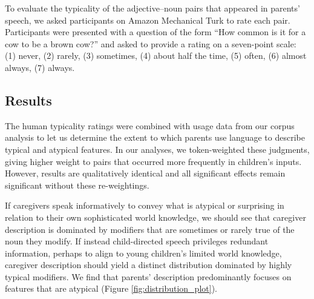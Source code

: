 \documentclass[10pt, letterpaper]{article}
\begin{document}
To evaluate the typicality of the adjective--noun pairs that appeared in
parents' speech, we asked participants on Amazon Mechanical Turk to rate
each pair. Participants were presented with a question of the form ``How
common is it for a cow to be a brown cow?'' and asked to provide a
rating on a seven-point scale: (1) never, (2) rarely, (3) sometimes, (4)
about half the time, (5) often, (6) almost always, (7) always.

\hypertarget{results}{%
\subsection{Results}\label{results}}

The human typicality ratings were combined with usage data from our
corpus analysis to let us determine the extent to which parents use
language to describe typical and atypical features. In our analyses, we
token-weighted these judgments, giving higher weight to pairs that
occurred more frequently in children's inputs. However, results are
qualitatively identical and all significant effects remain significant
without these re-weightings.

If caregivers speak informatively to convey what is atypical or
surprising in relation to their own sophisticated world knowledge, we
should see that caregiver description is dominated by modifiers that are
sometimes or rarely true of the noun they modify. If instead
child-directed speech privileges redundant information, perhaps to align
to young children's limited world knowledge, caregiver description
should yield a distinct distribution dominated by highly typical
modifiers. We find that parents' description predominantly focuses on
features that are atypical (Figure \ref{fig:distribution_plot}).
\end{document}
